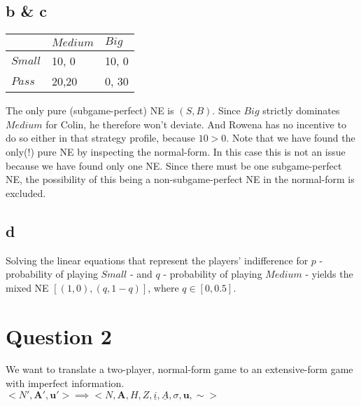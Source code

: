 \documentclass[10pt,a4paper]{article}
\begin{document}
\subsection*{b \& c}
\begin{table}[h]
\centering
\begin{tabular}[l]{|l|l|l|}
\hline
          & $Medium$ & $Big$  \\ \hline
$Small$     & 10, 0   & 10, 0 \\ \hline
$Pass$	& 20,20 & 0, 30 \\ \hline
\end{tabular}
\end{table}
The only pure (subgame-perfect) NE is $(S,B)$. Since $Big$ strictly dominates $Medium$ for Colin, he therefore won't deviate. And Rowena has no incentive to do so either in that strategy profile, because $10>0$. Note that we have found the only(!) pure NE by inspecting the normal-form. In this case this is not an issue because we have found only one NE. Since there must be one subgame-perfect NE, the possibility of this being a non-subgame-perfect NE in the normal-form is excluded.
\subsection*{d} 
Solving the linear equations that represent the players' indifference for $p$ - probability of playing $Small$ - and $q$ - probability of playing $Medium$ - yields the mixed NE $[(1,0),(q,1-q)]$, where $q\in [0,0.5]$.
\section*{Question 2}
We want to translate a two-player, normal-form game to an extensive-form game with imperfect information.\\
$<N',\boldsymbol{A}',\boldsymbol{u}'> \implies <N,\boldsymbol{A}, H, Z, \underline{i},\underline{A},\sigma,\boldsymbol{u},\sim>$
\end{document}
